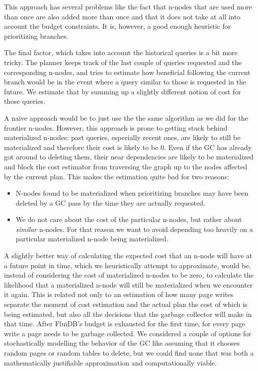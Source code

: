 This approach has several problems like the fact that n-nodes that are
used more than once are also added more than once and that it does not take
at all into account the budget constraints. It is, however, a good
enough heuristic for prioritizing branches.

The final factor, which takes into account the historical queries is a
bit more tricky. The planner keeps track of the last couple of queries
requested and the corresponding n-nodes, and tries to estimate how
beneficial following the current branch would be in the event where
a query similar to those is requested in the future. We estimate that
by summing up a slightly different notion of cost for those queries.

A naive approach would be to just use the the same algorithm as we did
for the frontier n-nodes. However, this approach is prone to getting
stuck behind materialized n-nodes: past queries, especially recent ones,
are likely to still be materialized and therefore their cost is likely
to be 0. Even if the GC has already got around to deleting them, their near
dependencies are likely to be materialized and block the cost estimator 
from traversing the graph up to the nodes affected by the current plan. This makes
the estimation quite bad for two reasons:

\begin{itemize}
\item N-nodes found to be materialized when prioritizing branches may have been
  deleted by a GC pass by the time they are actually requested.
\item We do not care about the cost of the particular n-nodes, but rather
  about \emph{similar} n-nodes. For that reason we want to avoid
  depending too heavily on a particular materialized n-node being
  materialized.
\end{itemize}

A slightly better way of calculating the expected cost that an n-node will
have at a future point in time, which we
heuristically attempt to approximate, would be, instead of
considering the cost of materialized n-nodes to be zero, to calculate
the likelihood that a materialized n-node will still be materialized
when we encounter it again. This is related not only to an estimation
of how many page writes separate the moment of cost estimation and the
actual plan the cost of which is being estimated, but also all the
decisions that the garbage collector will make in that time. After
FluiDB's budget is exhausted for the first time, for every page write
a page needs to be garbage collected. We considered a couple of
options for stochastically modelling the behavior of the GC like
assuming that it chooses random pages or random tables to delete, but
we could find none that was both a mathematically justifiable approximation and
computationally viable.

